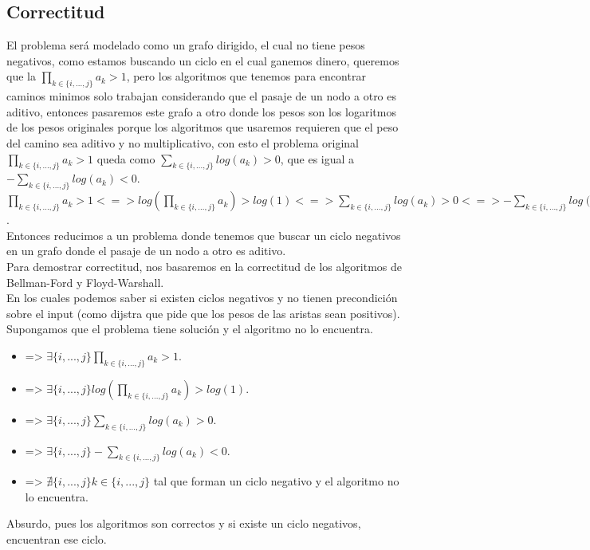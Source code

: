 \subsection{Correctitud}
El problema ser\'a modelado como un grafo dirigido, el cual no tiene pesos negativos, como estamos buscando un ciclo en el cual ganemos dinero, queremos que la $\prod_{k \in \{i,...,j\}} a_{k} > 1$, pero los algoritmos que tenemos para encontrar caminos minimos solo trabajan considerando que el pasaje de un nodo a otro es aditivo, entonces pasaremos este grafo a otro donde los pesos son los logaritmos de los pesos originales porque los algoritmos que usaremos requieren que el peso del camino sea aditivo y no multiplicativo, con esto el problema original $\prod_{k \in \{i,...,j\}} a_{k} > 1$ queda como $\sum_{k \in \{i,...,j\}} log(a_{k}) > 0$, que es igual a $-\sum_{k \in \{i,...,j\}} log(a_{k}) < 0$.\\
$\prod_{k \in \{i,...,j\}} a_{k} > 1 <=> log(\prod_{k \in \{i,...,j\}} a_{k}) > log(1) <=> \sum_{k \in \{i,...,j\}} log(a_{k}) > 0 <=> -\sum_{k \in \{i,...,j\}} log(a_{k}) < 0$.\\
Entonces reducimos a un problema donde tenemos que buscar un ciclo negativos en un grafo donde el pasaje de un nodo a otro es aditivo.\\
Para demostrar correctitud, nos basaremos en la correctitud de los algoritmos de Bellman-Ford y Floyd-Warshall.\\
En los cuales podemos saber si existen ciclos negativos y no tienen precondici\'on sobre el input (como dijstra que pide que los pesos de las aristas sean positivos).\\

Supongamos que el problema tiene soluci\'on y el algoritmo no lo encuentra.\\
\begin{itemize}
	\item => $\exists \{i,...,j\}  \prod_{k \in \{i,...,j\}} a_{k} > 1$.\\
	\item => $\exists \{i,...,j\}  log(\prod_{k \in \{i,...,j\}} a_{k}) > log(1)$.\\
	\item => $\exists \{i,...,j\}  \sum_{k \in \{i,...,j\}} log(a_{k}) > 0$.\\
	\item => $\exists \{i,...,j\}  -\sum_{k \in \{i,...,j\}} log(a_{k}) < 0$.\\
	\item => $\nexists \{i,...,j\} k \in \{i,...,j\}$ tal que forman un ciclo negativo y el algoritmo no lo encuentra.\\
\end{itemize}
Absurdo, pues los algoritmos son correctos y si existe un ciclo negativos, encuentran ese ciclo.\\

